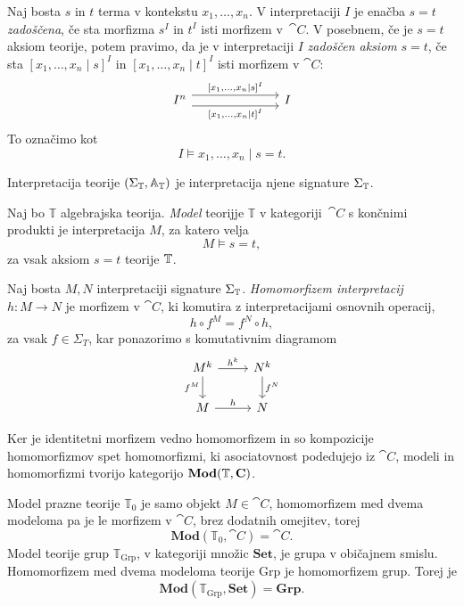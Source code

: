 \documentclass[../kategoricna_logika.tex]{subfiles}
\begin{document}
\begin{definicija}
  Naj bosta $s$ in $t$ terma v kontekstu $x_1, \ldots, x_n$.  V
  interpretaciji $I$ je enačba $s = t$ \emph{zadoščena}, če sta
  morfizma $s^I$ in $t^I$ isti morfizem v~$\cat{C}$.  V posebnem, če
  je $s = t$ aksiom teorije, potem pravimo, da je v
  interpretaciji $I$ \emph{zadoščen aksiom} $s = t$, če sta
  $[x_1, \ldots, x_n \mid s]^I$ in $[x_1, \ldots, x_n \mid t]^I$ isti
  morfizem v $\cat{C}$:
  \begin{equation*}
    \begin{tikzcd}[column sep = 7em]
      I^n \ar[r, shift left=1ex, "{[x_1, \ldots, x_n \mid s]^I}"]
      \ar[r, shift right=1ex, "{[x_1, \ldots, x_n \mid t]^I}"'] & I
    \end{tikzcd}
  \end{equation*}
  To označimo kot
  \[I \models x_1, \ldots, x_n \mid s = t.\] 
\end{definicija}
%
\begin{definicija}
Interpretacija teorije $(\Sigma_{\mathbb{T}}, \mathbb{A}_{\mathbb{T}})$ je interpretacija njene signature $\Sigma_{\mathbb{T}}$.
\end{definicija}
\begin{definicija}
Naj bo $\mathbb{T}$ algebrajska teorija.
\emph{Model} teorijje $\mathbb{T}$ v kategoriji~$\cat{C}$ s
končnimi produkti je interpretacija $M$, za katero velja
$$M \models s = t,$$
za vsak aksiom $s = t$ teorije $\mathbb{T}$.
\end{definicija}
%
\begin{definicija}
  Naj bosta $M, N$ interpretaciji signature $\Sigma_{\mathbb{T}}$.
 \emph{Homomorfizem interpretacij} $h : M \to N$ je morfizem v
 $\cat{C}$, ki komutira z interpretacijami osnovnih operacij,
$$h \circ f^M = f^N \circ h,$$
za vsak $f \in \Sigma_T$, kar ponazorimo s komutativnim diagramom
\begin{equation*}
  \begin{tikzcd}
    M^k \ar[d, "f^M"'] \ar[r, "h^k"] & N^k \ar[d, "f^N"] \\
    M \ar[r, "h"] & N
  \end{tikzcd}
\end{equation*}
\end{definicija}
\noindent
Ker je identitetni morfizem vedno homomorfizem in so kompozicije homomorfizmov spet homomorfizmi,
ki asociatovnost podedujejo iz $\cat{C}$, modeli in homomorfizmi tvorijo kategorijo $\mathbf{Mod}(\mathbb{T},{\operatorname{\mathbf{C}}})$.
%
\begin{primer}
  Model prazne teorije $\mathbb{T}_0$ je samo objekt $M \in \cat{C}$,
  homomorfizem med dvema modeloma pa je le morfizem v $\cat{C}$, brez
  dodatnih omejitev, torej
$$\mathbf{Mod}(\mathbb{T}_0, \cat{C}) = \cat{C}.$$
%
Model teorije grup $\mathbb{T}_{\mathrm{Grp}}$, v kategoriji množic
$\mathbf{Set}$, je grupa v običajnem smislu. Homomorfizem med dvema modeloma
teorije $\mathrm{Grp}$ je homomorfizem grup. Torej je
$$\mathbf{Mod}(\mathbb{T}_{\mathrm{Grp}}, \mathbf{Set}) = \mathbf{Grp}.$$
\end{primer}
\end{document}
